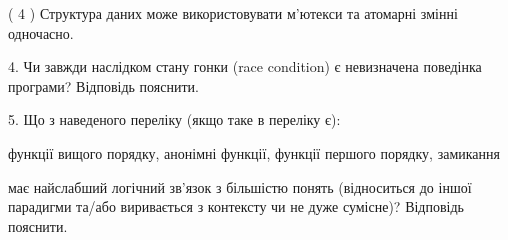 \documentclass[12pt, ukrainian]{article}
\begin{document}
\begin {large}
{( 4 ) Структура даних може використовувати м’ютекси та атомарні змінні одночасно.%


\vspace{5mm}
4. Чи завжди наслідком стану гонки (race condition) є невизначена поведінка програми? Відповідь пояснити.



\vspace{5mm}
5. Що з наведеного переліку (якщо таке в переліку є):

\vspace{4mm}
\qquad функції вищого порядку, анонімні функції, функції першого порядку, замикання

\vspace{4mm}
має найслабший логічний зв’язок з більшістю понять (відноситься до іншої парадигми та/або виривається з контексту чи не дуже сумісне)? Відповідь пояснити.

}
\end {large}
\end{document}
